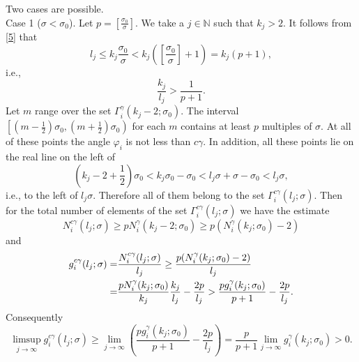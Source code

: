 \documentclass[11pt]{article}
\begin{document}
Two cases are possible.\\
Case 1 ($\sigma <\sigma _{0}$). Let $p=\left[ \frac{\sigma _{0}}{\sigma }\right] $. 
We take a $j\in \mathbb{N}$ such that $k_{j}>2$. It follows from \eqref{5}
that 
\begin{equation*}
l_{j}\le k_{j}\frac{\sigma _{0}}{\sigma }<k_{j}\left( \left[ \frac{\sigma
_{0}}{\sigma }\right] +1\right) =k_{j}( p+1) ,
\end{equation*}%
i.e., 
\begin{equation*}
\frac{k_{j}}{l_{j}}>\frac{1}{p+1}.
\end{equation*}%
Let $m$ range over the set $\Gamma _{i}^{\gamma }(
k_{j}-2;\sigma_{0})$. The interval $\left[ \left( m-\frac{1}{2}\right)
\sigma _{0},\left( m+\frac{1}{2}\right) \sigma _{0}\right) $ for each $m$
contains at least $p$ multiples of $\sigma $. At all of these points 
the angle $%
\varphi _{i}$ is not less than $c\gamma$. In addition, all these points lie
on the real line on the left of%
\begin{equation*}
\left( k_{j}-2+\frac{1}{2}\right) \sigma _{0}<k_{j}\sigma _{0}-\sigma
_{0}<l_{j}\sigma +\sigma -\sigma _{0}<l_{j}\sigma ,
\end{equation*}%
i.e., to the left of $l_{j}\sigma $. Therefore all of them belong to the set
$\Gamma _{i}^{c\gamma }( l_{j};\sigma )$.
Then for the total number of elements of the set $\Gamma _{i}^{c\gamma
}( l_{j};\sigma ) $ we have the estimate%
\begin{equation*}
N_{i}^{c\gamma }( l_{j};\sigma ) \ge pN_{i}^{\gamma }(
k_{j}-2;\sigma _{0}) \ge p( N_{i}^{\gamma }( k_{j};\sigma
_{0}) -2)
\end{equation*}%
and%
\begin{equation*}
\begin{split}
g_{i}^{c\gamma }( l_{j};\sigma ) = & \frac{N_{i}^{c\gamma }(
l_{j};\sigma ) }{l_{j}}\ge \frac{p( N_{i}^{\gamma }(
k_{j};\sigma _{0}) -2) }{l_{j}} \\
= & \frac{pN_{i}^{\gamma }( k_{j};\sigma _{0}) }{k_{j}}\frac{k_{j}}{%
l_{j}}-\frac{2p}{l_{j}}>\frac{pg_{i}^{\gamma }( k_{j};\sigma
_{0}) }{p+1}-\frac{2p}{l_{j}}.
\end{split}
\end{equation*}%
Consequently%
\begin{equation*}
\limsup_{j\to \infty }g_{i}^{c\gamma }( l_{j};\sigma )
\ge \lim_{j\to \infty }\left( \frac{pg_{i}^{\gamma }(
k_{j};\sigma _{0}) }{p+1}-\frac{2p}{l_{j}}\right) 
=\frac{p}{p+1}\lim_{j\to \infty }g_{i}^{\gamma }( k_{j};\sigma
_{0}) >0.
\end{equation*}
\end{document}
